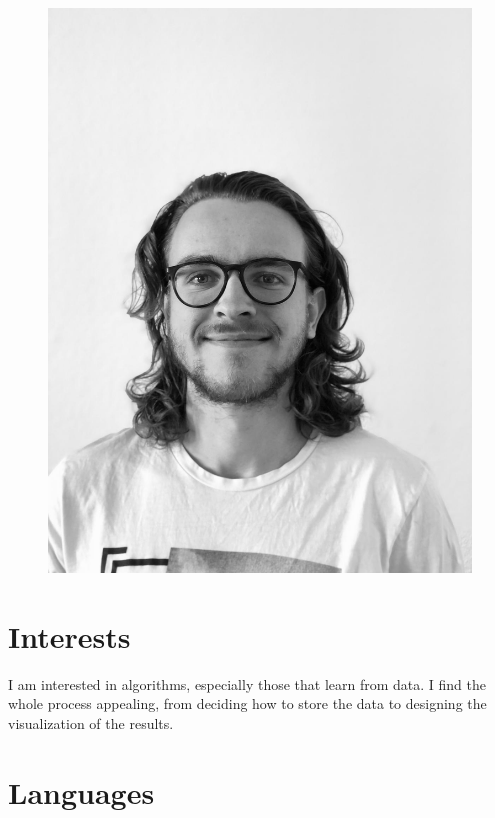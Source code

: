 \documentclass[]{commands}
\begin{document}
\begin{aside}
    ~

\vspace{-3.5cm}
\begin{figure}[ht]
	\hspace{0.3cm}
	\includegraphics[width=.71\linewidth]{img/portrait.jpg}
\end{figure}

\vspace{3.5mm}
\section{Interests}
\vspace{3.5mm}

I am interested in algorithms, especially those that learn from data. I find the whole process appealing, from deciding how to store the data to designing the visualization of the results.


\vspace{3.5mm}
\section{Languages}
\vspace{3.5mm}


\end{aside}
\end{document}
